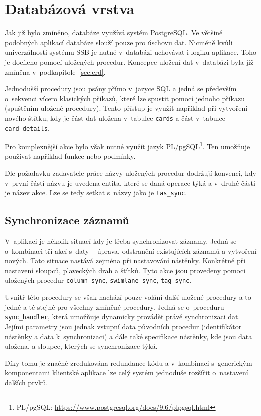 \section{Databázová vrstva}
Jak již bylo zmíněno, databáze využívá systém PostgreSQL. Ve většině podobných aplikací databáze slouží pouze pro úschovu dat. Nicméně kvůli univerzálnosti systému SSB je nutné v~databázi uchovávat i logiku aplikace. Toho je docíleno pomocí uložených procedur. Koncepce uložení dat v~databázi byla již zmíněna v~podkapitole~\ref{sec:erd}.

Jednodušší procedury jsou psány přímo v~jazyce SQL a jedná se především o~sekvenci vícero klasických příkazů, které lze spustit pomocí jednoho příkazu (spuštěním uložené procedury). Tento přístup je využit například při vytvoření nového štítku, kdy je část dat uložena v~tabulce \texttt{cards} a část v~tabulce \texttt{card\_details}.

Pro komplexnější akce bylo však nutné využít jazyk PL/pgSQL\footnote{PL/pgSQL: \url{https://www.postgresql.org/docs/9.6/plpgsql.html}}. Ten umožňuje používat například funkce nebo podmínky.

Dle požadavku zadavatele práce názvy uložených procedur dodržují konvenci, kdy v~první částí názvu je uvedena entita, které se daná operace týká a v~druhé části je název akce. Lze se tedy setkat s~názvy jako je \texttt{tas\_sync}. 


\subsection{Synchronizace záznamů}
V~aplikaci je několik situací kdy je třeba synchronizovat záznamy. Jedná se o~kombinaci tří akcí s~daty -- úprava, odstranění existujících záznamů a vytvoření nových. Tato situace nastává zejména při nastavování nástěnky. Konkrétně při nastavení sloupců, plaveckých drah a štítků. Tyto akce jsou provedeny pomoci uložených procedur \texttt{column\_sync}, \texttt{swimlane\_sync}, \texttt{tag\_sync}.

Uvnitř této procedury se však nachází pouze volání další uložené procedury a to jedné a té stejné pro všechny zmíněné procedury. Jedná se o~proceduru \texttt{sync\_handler}, která umožňuje dynamicky provádět právě synchronizaci dat. Jejími parametry jsou jednak vstupní data původních procedur (identifikátor nástěnky a data k~synchronizaci) a dále také specifikace nástěnky, kde jsou data uložena, a sloupce, kterých se synchronizace týká.

Díky tomu je značně zredukována redundance kódu a v~kombinaci s~generickým komponentami klientské aplikace lze celý systém jednoduše rozšířit o~nastavení dalších prvků.


